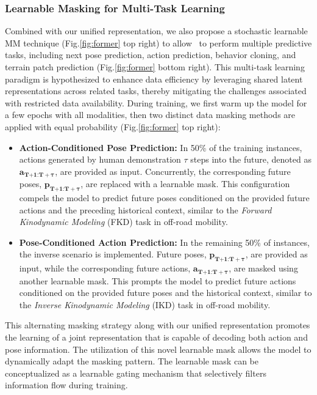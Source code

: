 \subsubsection{Learnable Masking for Multi-Task Learning}
Combined with our unified representation, we also propose a stochastic learnable MM technique (Fig.\ref{fig:former} top right) to allow \former~to perform multiple predictive tasks, including next pose prediction, action prediction, behavior cloning, and terrain patch prediction (Fig.\ref{fig:former} bottom right). This multi-task learning paradigm is hypothesized to enhance data efficiency by leveraging shared latent representations across related tasks, thereby mitigating the challenges associated with restricted data availability.
During training, we first warm up the model for a few epochs with all modalities, then two distinct data masking methods are applied with equal probability (Fig.\ref{fig:former} top right):
\begin{itemize}
    \item \textbf{Action-Conditioned Pose Prediction:} In 50\% of the training instances, actions generated by human demonstration $\tau$ steps into the future, denoted as $\mathbf{a_{\text{T+1:T}+\tau}}$, are provided as input. Concurrently, the corresponding future poses, $\mathbf{p_{\text{T+1:T}+\tau}}$, are replaced with a learnable mask. This configuration compels the model to predict future poses conditioned on the provided future actions and the preceding historical context, similar to the \emph{Forward Kinodynamic Modeling} (FKD) task in off-road mobility. 

    \item \textbf{Pose-Conditioned Action Prediction:} In the remaining 50\% of instances, the inverse scenario is implemented. Future poses, $\mathbf{p_{\text{T+1:T}+\tau}}$, are provided as input, while the corresponding future actions, $\mathbf{a_{\text{T+1:T}+\tau}}$, are masked using another learnable mask. This prompts the model to predict future actions conditioned on the provided future poses and the historical context, similar to the \emph{Inverse Kinodynamic Modeling} (IKD) task in off-road mobility. 
\end{itemize}
This alternating masking strategy along with our unified representation promotes the learning of a joint representation that is capable of decoding both action and pose information. The utilization of this novel learnable mask allows the model to dynamically adapt the masking pattern. The learnable mask can be conceptualized as a learnable gating mechanism that selectively filters information flow during training.

